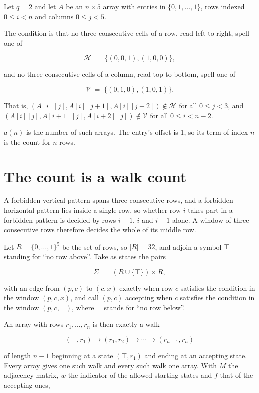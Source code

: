 \documentclass[11pt]{article}
\theoremstyle{definition}
\begin{document}
Let $q = 2$ and let $A$ be an $n \times 5$ array with entries in $\{0,1,\dots,1\}$, rows indexed $0 \le i < n$ and columns $0 \le j < 5$.

The condition is that no three consecutive cells of a row, read left to right, spell one of

\[\mathcal{H} \;=\; \{(0,0,1), (1,0,0)\},\]

and no three consecutive cells of a column, read top to bottom, spell one of

\[\mathcal{V} \;=\; \{(0,1,0), (1,0,1)\}.\]

That is, $(A[i][j],A[i][j{+}1],A[i][j{+}2]) \notin \mathcal{H}$ for all $0 \le j < 3$, and $(A[i][j],A[i{+}1][j],A[i{+}2][j]) \notin \mathcal{V}$ for all $0 \le i < n-2$.

$a(n)$ is the number of such arrays. The entry's offset is 1, so its term of index $n$ is the count for $n$ rows.

\section{The count is a walk count}

A forbidden vertical pattern spans three consecutive rows, and a forbidden horizontal pattern lies inside a single row, so whether row $i$ takes part in a forbidden pattern is decided by rows $i-1$, $i$ and $i+1$ alone. A window of three consecutive rows therefore decides the whole of its middle row.

Let $R = \{0,\dots,1\}^{5}$ be the set of rows, so $|R| = 32$, and adjoin a symbol $\top$ standing for ``no row above''. Take as states the pairs

\[\Sigma \;=\; (R \cup \{\top\}) \times R,\]

with an edge from $(p,c)$ to $(c,x)$ exactly when row $c$ satisfies the condition in the window $(p,c,x)$, and call $(p,c)$ accepting when $c$ satisfies the condition in the window $(p,c,\bot)$, where $\bot$ stands for ``no row below''.

An array with rows $r_1,\dots,r_n$ is then exactly a walk

\[(\top,r_1) \to (r_1,r_2) \to \cdots \to (r_{n-1},r_n)\]

of length $n-1$ beginning at a state $(\top,r_1)$ and ending at an accepting state. Every array gives one such walk and every such walk one array. With $M$ the adjacency matrix, $w$ the indicator of the allowed starting states and $f$ that of the accepting ones,
\end{document}
